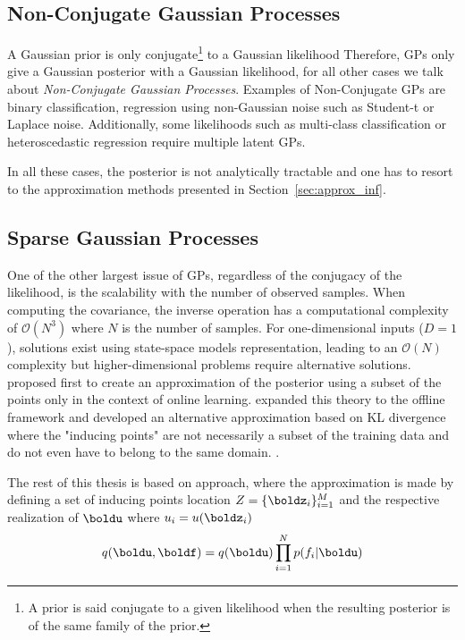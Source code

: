 \subsection{Non-Conjugate Gaussian Processes}

A Gaussian prior is only conjugate\footnote{A prior is said conjugate to a given likelihood when the resulting posterior is of the same family of the prior.} to a Gaussian likelihood
Therefore, \ac{GPs} only give a Gaussian posterior with a Gaussian likelihood, for all other cases we talk about \textit{Non-Conjugate Gaussian Processes}.
Examples of Non-Conjugate \ac{GPs} are binary classification, regression using non-Gaussian noise such as Student-t or Laplace noise.
Additionally, some likelihoods such as multi-class classification or heteroscedastic regression require multiple latent \ac{GPs}.

In all these cases, the posterior is not analytically tractable and one has to resort to the approximation methods presented in Section~\ref{sec:approx_inf}.

\subsection{Sparse Gaussian Processes}
One of the other largest issue of \ac{GPs}, regardless of the conjugacy of the likelihood, is the scalability with the number of observed samples.
When computing the covariance, the inverse operation has a computational complexity of $\mathcal{O}(N^3)$ where $N$ is the number of samples.
For one-dimensional inputs ($D=1$), solutions exist using state-space models representation, leading to an $\mathcal{O}(N)$ complexity but higher-dimensional problems require alternative solutions.
\citet{csato2002sparse} proposed first to create an approximation of the posterior using a subset of the points only in the context of online learning.
\citet{snelsonSparseGaussianProcesses2009} expanded this theory to the offline framework and \citet{Titsias2009} developed an alternative approximation based on KL divergence where the "inducing points" are not necessarily a subset of the training data and do not even have to belong to the same domain. .

The rest of this thesis is based on \citet{Titsias2009} approach, where the approximation is made by defining a set of inducing points location $Z=\{\boldz_i\}_{i=1}^M$ and the respective realization of $\boldu$ where $u_i = u(\boldz_i)$
\begin{align}
    q(\boldu,\boldf) = q(\boldu)\prod_{i=1}^N p(f_i|\boldu)
    \label{eq:titsias_assumption}
\end{align}



